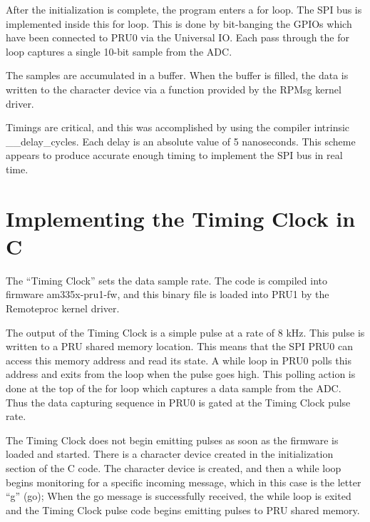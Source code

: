 After the initialization is complete, the program enters a for loop.  The SPI bus is implemented inside this for loop.  This is done by bit-banging the GPIOs which have been connected to PRU0 via the Universal IO.  Each pass through the for loop captures a single 10-bit sample from the ADC.

The samples are accumulated in a buffer.  When the buffer is filled, the data is written to the character device via a function provided by the RPMsg kernel driver.

Timings are critical, and this was accomplished by using the compiler intrinsic \_\_delay\_cycles.  Each delay is an absolute value of 5 nanoseconds.  This scheme appears to produce accurate enough timing to implement the SPI bus in real time.  

\section{Implementing the Timing Clock in C}

The ``Timing Clock'' sets the data sample rate.  The code is compiled into firmware am335x-pru1-fw, and this binary file is loaded into PRU1 by the Remoteproc kernel driver.

The output of the Timing Clock is a simple pulse at a rate of 8 kHz.  This pulse is written to a PRU shared memory location.  This means that the SPI PRU0 can access this memory address and read its state.  A while loop in PRU0 polls this address and exits from the loop when the pulse goes high.  This polling action is done at the top of the for loop which captures a data sample from the ADC.  Thus the data capturing sequence in PRU0 is gated at the Timing Clock pulse rate.

The Timing Clock does not begin emitting pulses as soon as the firmware is loaded and started.  There is a character device created in the initialization section of the C code.  The character device is created, and then a while loop begins monitoring for a specific incoming message, which in this case is the letter ``g'' (go);  When the go message is successfully received, the while loop is exited and the Timing Clock pulse code begins emitting pulses to PRU shared memory.


